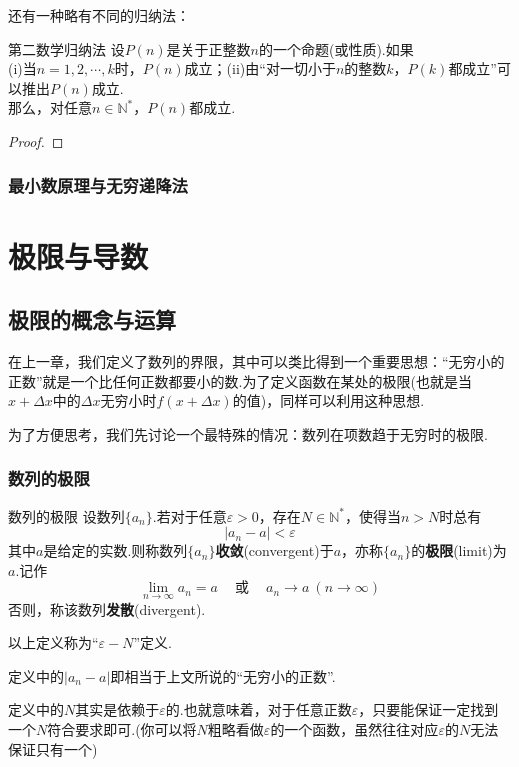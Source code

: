 \documentclass[lang=cn, zihao=5]{elegantbook}
\newcommand{\cor}{~\textit{或}~}
\begin{document}
还有一种略有不同的归纳法：

\begin{theorem}{第二数学归纳法}
	设$P(n)$是关于正整数$n$的一个命题(或性质).如果 \\
	(i)当$n=1,2, \cdots ,k$时，$P(n)$成立；(ii)由“对一切小于$n$的整数$k$，$P(k)$都成立”可以推出$P(n)$成立. \\
	那么，对任意$n \in \mathbb{N}^{*}$，$P(n)$都成立.
\end{theorem}
\begin{proof}
\end{proof}

\subsection{最小数原理与无穷递降法}

\chapter{极限与导数}

\section{极限的概念与运算}

在上一章，我们定义了数列的界限，其中可以类比得到一个重要思想：“无穷小的正数”就是一个比任何正数都要小的数.为了定义函数在某处的极限(也就是当$x+\Delta x$中的$\Delta x$无穷小时$f(x+\Delta x)$的值)，同样可以利用这种思想.

为了方便思考，我们先讨论一个最特殊的情况：数列在项数趋于无穷时的极限.

\subsection{数列的极限}

\begin{definition}{数列的极限}
	设数列$\{ a_n \}$.若对于任意$\varepsilon >0$，存在$N \in \mathbb{N}^{*}$，使得当$n > N$时总有$$|a_n-a|<\varepsilon$$
	其中$a$是给定的实数.则称数列$\{ a_n \}$\textbf{收敛}(convergent)于$a$，亦称$\{ a_n \}$的\textbf{极限}(limit)为$a$.记作$$\lim_{n \to \infty}{a_n}=a \quad \cor \quad a_n \to a~(n \to \infty)$$
	否则，称该数列\textbf{发散}(divergent).
\end{definition}
\begin{remark}
	以上定义称为“$\varepsilon - N$”定义.
\end{remark}
\begin{remark}
	定义中的$|a_n-a|$即相当于上文所说的“无穷小的正数”.
\end{remark}
\begin{remark}
	定义中的$N$其实是依赖于$\varepsilon$的.也就意味着，对于任意正数$\varepsilon$，只要能保证一定找到一个$N$符合要求即可.(你可以将$N$粗略看做$\varepsilon$的一个函数，虽然往往对应$\varepsilon$的$N$无法保证只有一个)
\end{remark}
\end{document}
